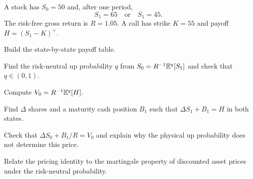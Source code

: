 \begin{exercise}
A stock has $S_0=50$ and, after one period,
\[
S_1=65\quad\text{or}\quad S_1=45.
\]
The risk-free gross return is $R=1.05$. A call has strike $K=55$ and payoff
$H=(S_1-K)^+$.
\begin{exparts}
  \item Build the state-by-state payoff table.
  \item Find the risk-neutral up probability $q$ from
  $S_0=R^{-1}\mathbb E^q[S_1]$ and check that $q\in(0,1)$.
  \item Compute $V_0=R^{-1}\mathbb E^q[H]$.
  \item Find $\Delta$ shares and a maturity cash position $B_1$ such that
  $\Delta S_1+B_1=H$ in both states.
  \item Check that $\Delta S_0+B_1/R=V_0$ and explain why the physical up
  probability does not determine this price.
  \item Relate the pricing identity to the martingale property of discounted
  asset prices under the risk-neutral probability.
\end{exparts}
\end{exercise}
\fi
